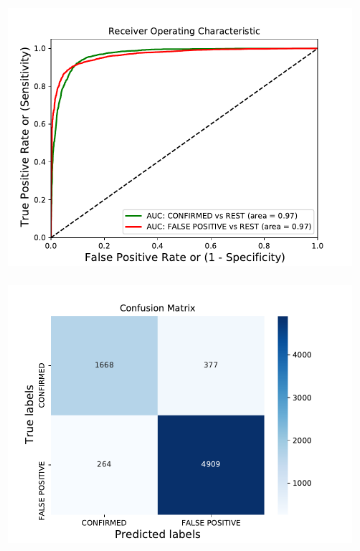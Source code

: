 \begin{figure}[H]
                \centering
                \begin{subfigure}{.49\textwidth}
                \includegraphics[width = 1\textwidth]{data/bLR_overfit_roc.pdf}
                \end{subfigure}
                \begin{subfigure}{.49\textwidth}
                \includegraphics[width = 1\textwidth]{data/bLR_overfit_cm.pdf}
                \end{subfigure}
                \begin{subfigure}{.49\textwidth}

\end{subfigure}
\end{figure}
